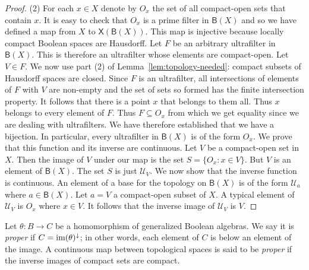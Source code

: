 \documentclass[a4paper]{amsart}
\begin{document}
\begin{proof}
(2) For each $x \in X$ denote by $O_{x}$ the set of all compact-open sets that contain $x$.
It is easy to check that $O_{x}$ is a prime filter in $\mathsf{B}(X)$
and so we have defined a map from $X$ to $\mathsf{X} (\mathsf{B}(X))$.
This map is injective because locally compact Boolean spaces are Hausdorff.
Let $F$ be an arbitrary ultrafilter in $\mathsf{B}(X)$.
This is therefore an ultrafilter whose elements are compact-open.
Let $V \in F$.
We now use part (2) of Lemma~\ref{lem:topology-needed}:
compact subsets of Hausdorff spaces are closed.
Since $F$ is an ultrafilter, 
all intersections of elements of $F$ with $V$ are non-empty and the set of sets so formed has the finite 
intersection property.
It follows that there is a point $x$ that belongs to them all.
Thus $x$ belongs to every element of $F$.
Thus $F \subseteq O_{x}$ from which we get equality since we are dealing with ultrafilters.
We have therefore established that we have a bijection.
In particular, every ultrafilter in $\mathsf{B}(X)$ is of the form $O_{x}$.
We prove that this function and its inverse are continuous.
Let $V$ be a compact-open set in $X$.
Then the image of $V$ under our map is the set
$S = \{O_{x} \colon x \in V\}$.
But $V$ is an element of $\mathsf{B}(X)$.
The set $S$ is just $\mathscr{U}_{V}$.
We now show that the inverse function is continuous.
An element of a base for the topology on $\mathsf{B}(X)$ is of the form $\mathscr{U}_{a}$
where $a \in \mathsf{B}(X)$.
Let $a = V$ a compact-open subset of $X$.
A typical element of $\mathscr{U}_{V}$ is $O_{x}$ where $x \in V$.
It follows that the inverse image of $\mathscr{U}_{V}$ is $V$.
\end{proof}



Let $\theta \colon B \rightarrow C$ be a homomorphism of generalized Boolean algebras.
We say it is {\em proper} if $C = \mbox{\rm im}(\theta)^{\downarrow}$;
in other words, each element of $C$ is below an element of the image.
A continuous map between topological spaces is said to be {\em proper}
if the inverse images of compact sets are compact.
\end{document}
